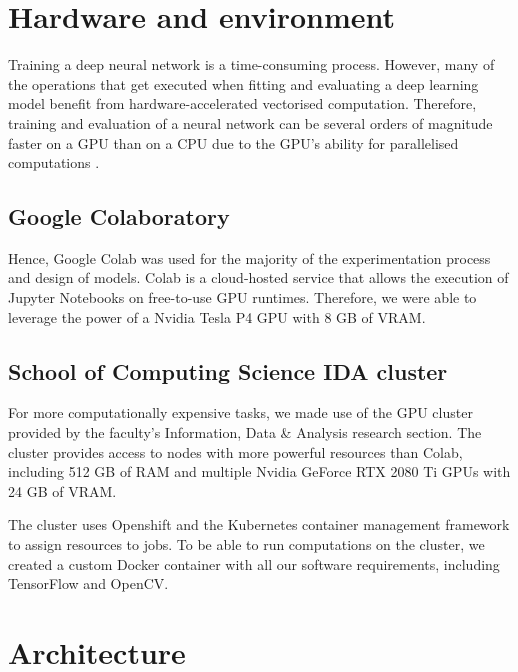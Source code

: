 \documentclass{l4proj}
\begin{document}

\section{Hardware and environment}

Training a deep neural network is a time-consuming process. However, many of the operations that get executed when fitting and evaluating a deep learning model benefit from hardware-accelerated vectorised computation. Therefore, training and evaluation of a neural network can be several orders of magnitude faster on a GPU than on a CPU due to the GPU's ability for parallelised computations \citep{shi_benchmarking_2016}. 

\subsection{Google Colaboratory}

Hence, Google Colab was used for the majority of the experimentation process and design of models. Colab is a cloud-hosted service that allows the execution of Jupyter Notebooks on free-to-use GPU runtimes. Therefore, we were able to leverage the power of a Nvidia Tesla P4 GPU with 8 GB of VRAM.

\subsection{School of Computing Science IDA cluster}

For more computationally expensive tasks, we made use of the GPU cluster provided by the faculty's Information, Data \& Analysis research section. The cluster provides access to nodes with more powerful resources than Colab, including 512 GB of RAM and multiple Nvidia GeForce RTX 2080 Ti GPUs with 24 GB of VRAM.

The cluster uses Openshift and the Kubernetes container management framework to assign resources to jobs. To be able to run computations on the cluster, we created a custom Docker container with all our software requirements, including TensorFlow and OpenCV.



\section{Architecture}
\end{document}
